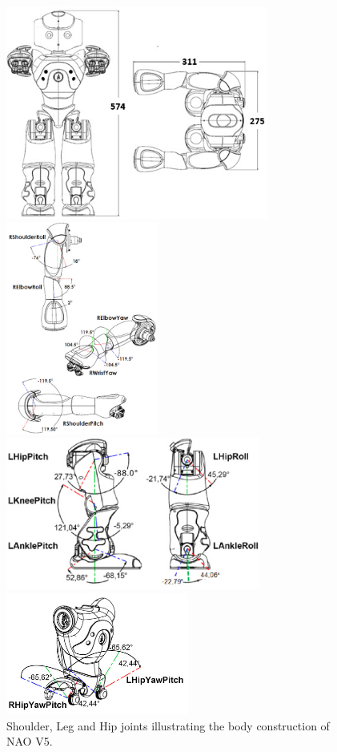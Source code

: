 \begin{figure}
	\begin{minipage}
		{.6
			\textwidth} 
		\includegraphics[height=7cm]{figures/content/nao-body.jpg} 
	\end{minipage}
	\begin{minipage}
		{.4 
			\textwidth} 
		\includegraphics[height=7cm]{figures/content/nao-hand.jpg} 
	\end{minipage}
	\begin{minipage}
		{.6 
			\textwidth} 
		\includegraphics[height=50mm]{figures/content/nao-leg.jpg} 
	\end{minipage}
	\begin{minipage}
		{.4 
			\textwidth} 
		\includegraphics[height=40mm]{figures/content/nao-hip.jpg} 
	\end{minipage}
	\caption{Shoulder, Leg and Hip joints illustrating the body construction of NAO V5. \cite{nao-spec}} \label{fg:nao:body} 
\end{figure}
